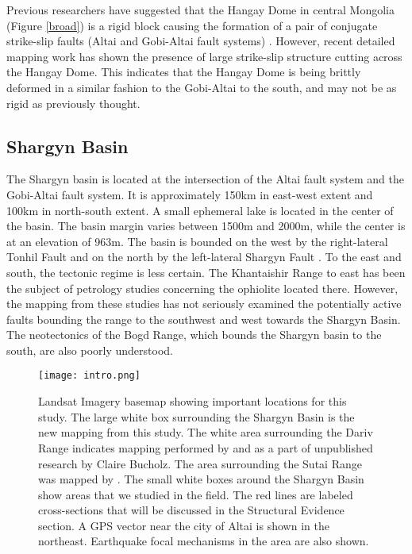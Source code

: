 	Previous researchers have suggested that the Hangay Dome in central Mongolia (Figure \ref{broad}) is a rigid block causing the formation of a pair of conjugate strike-slip faults (Altai and Gobi-Altai fault systems) \citep{Cunningham2005a}. However, recent detailed mapping work has shown the presence of large strike-slip structure cutting across the Hangay Dome. This indicates that the Hangay Dome is being brittly deformed in a similar fashion to the Gobi-Altai to the south, and may not be as rigid as previously thought\citep{Walker2006}\citep{Walker2007}\citep{Walker2008}.

\subsection{Shargyn Basin}

	The Shargyn basin is located at the intersection of the Altai fault system and the Gobi-Altai fault system. It is approximately 150km in east-west extent and 100km in north-south extent. A small ephemeral lake is located in the center of the basin. The basin margin varies between 1500m and 2000m, while the center is at an elevation of 963m. The basin is bounded on the west by the right-lateral Tonhil Fault and on the north by the left-lateral Shargyn Fault \citep{Cunningham2003}. To the east and south, the tectonic regime is less certain. The Khantaishir Range to east has been the subject of petrology studies concerning the ophiolite located there. However, the mapping from these studies has not seriously examined the potentially active faults bounding the range to the southwest and west towards the Shargyn Basin.  The neotectonics of the Bogd Range, which bounds the Shargyn basin to the south, are also poorly understood.

\begin{figure}[h!]
	\centering
	\texttt{[image: intro.png]}
	\caption{Landsat Imagery basemap showing important locations for this study. The large white box surrounding the Shargyn Basin is the new mapping from this study. The white area surrounding the Dariv Range indicates mapping performed by \citet{Dijkstra2006} and as a part of unpublished research by Claire Bucholz. The area surrounding the Sutai Range was mapped by \citet{Cunningham2003}. The small white boxes around the Shargyn Basin show areas that we studied in the field. The red lines are labeled cross-sections that will be discussed in the Structural Evidence section. A GPS vector near the city of Altai is shown in the northeast. Earthquake focal mechanisms in the area are also shown.}
	\label{intro}
\end{figure}
	

